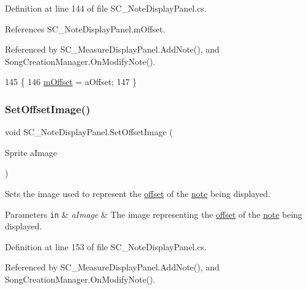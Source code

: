 Definition at line 144 of file S\+C\+\_\+\+Note\+Display\+Panel.\+cs.



References S\+C\+\_\+\+Note\+Display\+Panel.\+m\+Offset.



Referenced by S\+C\+\_\+\+Measure\+Display\+Panel.\+Add\+Note(), and Song\+Creation\+Manager.\+On\+Modify\+Note().


\begin{DoxyCode}
145     \{
146         \hyperlink{group___s_c___n_d_p_priv_var_ga0a78a2c25da29d944d56d1c8ebb74d03}{mOffset} = aOffset;
147     \}
\end{DoxyCode}
\mbox{\label{group___s_c___n_d_p_unity_gaa0a517d1359cd1ed109a130bd52763f1}} 
\subsubsection{\texorpdfstring{Set\+Offset\+Image()}{SetOffsetImage()}}
{\footnotesize\ttfamily void S\+C\+\_\+\+Note\+Display\+Panel.\+Set\+Offset\+Image (\begin{DoxyParamCaption}\item[{Sprite}]{a\+Image }\end{DoxyParamCaption})}



Sets the image used to represent the \hyperlink{group___music_structs_ae281187907aed4c728c7981300dbebaf}{offset} of the \hyperlink{group___music_structs_struct_music_1_1_combined_note}{note} being displayed. 


\begin{DoxyParams}[1]{Parameters}
\mbox{\tt in}  & {\em a\+Image} & The image representing the \hyperlink{group___music_structs_ae281187907aed4c728c7981300dbebaf}{offset} of the \hyperlink{group___music_structs_struct_music_1_1_combined_note}{note} being displayed. \\
\hline
\end{DoxyParams}


Definition at line 153 of file S\+C\+\_\+\+Note\+Display\+Panel.\+cs.



Referenced by S\+C\+\_\+\+Measure\+Display\+Panel.\+Add\+Note(), and Song\+Creation\+Manager.\+On\+Modify\+Note().


